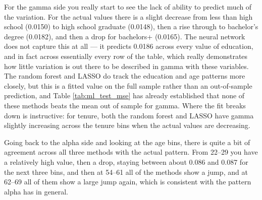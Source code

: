 \documentclass[12pt]{article}
\begin{document}
\begin{onehalfspace}
\begin{table}[H]
    \centering
    \caption{Mean Predicted Gamma and Alpha by Demographic Group, Hourly Earnings (x 100)}
    \label{tab:gamma_alpha_pred_means}
    \resizebox{\textwidth}{!}{%
        
    }
\end{table}

\begin{table}[H]
    \centering
    \caption{Mean Predicted Gamma and Alpha by Demographic Group, Annual Earnings (x 100)}
    \label{tab:gamma_alpha_fearn_pred_means}
    \resizebox{\textwidth}{!}{%
        
    }
\end{table}


For the gamma side you really start to see the lack of ability to predict much of the variation. For the actual values there is a slight decrease from less than high school (0.0150) to high school graduate (0.0148), then a rise through to bachelor's degree (0.0182), and then a drop for bachelors+ (0.0165). The neural network does not capture this at all --- it predicts 0.0186 across every value of education, and in fact across essentially every row of the table, which really demonstrates how little variation is out there to be described in gamma with these variables. The random forest and LASSO do track the education and age patterns more closely, but this is a fitted value on the full sample rather than an out-of-sample prediction, and Table \ref{tab:ml_test_mse} has already established that none of these methods beats the mean out of sample for gamma. Where the fit breaks down is instructive: for tenure, both the random forest and LASSO have gamma slightly increasing across the tenure bins when the actual values are decreasing.

Going back to the alpha side and looking at the age bins, there is quite a bit of agreement across all three methods with the actual pattern. From 22--29 you have a relatively high value, then a drop, staying between about 0.086 and 0.087 for the next three bins, and then at 54--61 all of the methods show a jump, and at 62--69 all of them show a large jump again, which is consistent with the pattern alpha has in general.


\end{onehalfspace}
\end{document}

